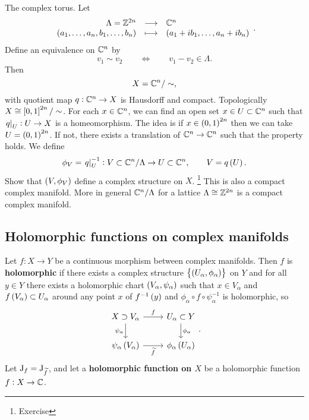\begin{example}
The complex torus. Let
$$ \function{\Lambda = \ZZ^{2n}}{\CC^n}{\br{a_1, \dots, a_n, b_1, \dots, b_n}}{\br{a_1 + ib_1, \dots, a_n + ib_n}}. $$
Define an equivalence on $ \mathbb{C}^n $ by
$$ v_1 \sim v_2 \qquad \iff \qquad v_1 - v_2 \in \Lambda. $$
Then
$$ X = \mathbb{C}^n / \sim, $$
with quotient map $ q : \mathbb{C}^n \to X $ is Hausdorff and compact. Topologically $ X \cong \sbr{0, 1}^{2n} / \sim $. For each $ x \in \mathbb{C}^n $, we can find an open set $ x \in U \subset \mathbb{C}^n $ such that $ \left. q \right|_U : U \to X $ is a homeomorphism. The idea is if $ x \in \br{0, 1}^{2n} $ then we can take $ U = \br{0, 1}^{2n} $. If not, there exists a translation of $ \mathbb{C}^n \to \mathbb{C}^n $ such that the property holds. We define
$$ \phi_V = \eval{q}_U^{-1} : V \subset \CC^n / \Lambda \to U \subset \CC^n, \qquad V = q\br{U}. $$
Show that $ \br{V, \phi_V} $ define a complex structure on $ X $. \footnote{Exercise} This is also a compact complex manifold. More in general $ \mathbb{C}^n / \Lambda $ for a lattice $ \Lambda \cong \mathbb{Z}^{2n} $ is a compact complex manifold.
\end{example}

\subsection{Holomorphic functions on complex manifolds}


\begin{definition}
Let $ f : X \to Y $ be a continuous morphism between complex manifolds. Then $ f $ is \textbf{holomorphic} if there exists a complex structure $ \cbr{\br{U_\alpha, \phi_\alpha}} $ on $ Y $ and for all $ y \in Y $ there exists a holomorphic chart $ \br{V_\alpha, \psi_\alpha} $ such that $ x \in V_\alpha $ and $ f\br{V_\alpha} \subset U_\alpha $ around any point $ x $ of $ f^{-1}\br{y} $ and $ \phi_\alpha \circ f \circ \psi_\alpha^{-1} $ is holomorphic, so
$$
\begin{tikzcd}
X \supset V_\alpha \arrow{r}{f} \arrow[swap]{d}{\psi_\alpha} & U_\alpha \subset Y \arrow{d}{\phi_\alpha} \\
\psi_\alpha\br{V_\alpha} \arrow[swap]{r}{\widetilde{f}} & \phi_\alpha\br{U_\alpha}
\end{tikzcd}.
$$
Let $ \mathrm{J}_f = \mathrm{J}_{\widetilde{f}} $, and let a \textbf{holomorphic function on $ X $} be a holomorphic function $ f : X \to \mathbb{C} $.
\end{definition}

